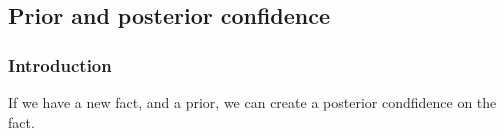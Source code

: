 
\subsection{Prior and posterior confidence}

\subsubsection{Introduction}

If we have a new fact, and a prior, we can create a posterior condfidence on the fact.

